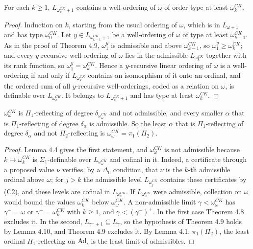 \documentclass[11pt]{article}
\begin{document}
\begin{statement} For each $k \ge 1$, $L_{\omega_k^{CK}+1}$ contains a well-ordering of $\omega$ of
order type at least $\omega_k^{CK}$.
\end{statement}

\begin{proof}
Induction on $k$, starting from the usual ordering of $\omega$, which is in $L_{\omega+1}$ and has type
$\omega_0^{CK}$. Let $y \in L_{\omega_{k-1}^{CK}+1}$ be a well-ordering of $\omega$ of type at least
$\omega_{k-1}^{CK}$. As in the proof of Theorem 4.9, $\omega_1^y$ is admissible and above $\omega_{k-1}^{CK}$, so
$\omega_1^y \ge \omega_k^{CK}$; and every $y$-recursive well-ordering of $\omega$ lies in the admissible
$L_{\omega_k^{CK}}$ together with its rank function, so $\omega_1^y = \omega_k^{CK}$. Hence a $y$-recursive linear
ordering of $\omega$ is a well-ordering if and only if $L_{\omega_k^{CK}}$ contains an isomorphism of it onto an
ordinal, and the ordered sum of all $y$-recursive well-orderings, coded as a relation on $\omega$, is definable over
$L_{\omega_k^{CK}}$. It belongs to $L_{\omega_k^{CK}+1}$ and has type at least $\omega_k^{CK}$.
\end{proof}

\begin{statement} $\omega_\omega^{CK}$ is $\Pi_1$-reflecting of degree
$\delta_{\omega_\omega^{CK}}$ and not admissible, and every smaller $\alpha$ that is $\Pi_1$-reflecting of degree
$\delta_\alpha$ is admissible. So the least $\alpha$ that is $\Pi_1$-reflecting of degree $\delta_\alpha$ and not
$\Pi_2$-reflecting is $\omega_\omega^{CK} = \pi_1(\Pi_2)$.
\end{statement}

\begin{proof}
Lemma 4.4 gives the first statement, and $\omega_\omega^{CK}$ is not admissible because $k \mapsto \omega_k^{CK}$ is
$\Sigma_1$-definable over $L_{\omega_\omega^{CK}}$ and cofinal in it. Indeed, a certificate through a proposed value
$\nu$ verifies, by a $\Delta_0$ condition, that $\nu$ is the $k$-th admissible ordinal above $\omega$; for $j > k$ the
admissible level $L_{\omega_j^{CK}}$ contains these certificates by (C2), and these levels are cofinal in
$L_{\omega_\omega^{CK}}$. If
$L_{\omega_\omega^{CK}}$ were admissible, collection on $\omega$ would bound the values $\omega_k^{CK}$ below
$\omega_\omega^{CK}$. A non-admissible limit $\gamma <
\omega_\omega^{CK}$ has $\gamma^- = \omega$ or $\gamma^- = \omega_k^{CK}$ with $k \ge 1$, and $\gamma < (\gamma^-)^+$.
In the first case Theorem 4.8 excludes it. In the second, $L_{\gamma^- + 1} \subseteq L_\gamma$, so the hypothesis of
Theorem 4.9 holds by Lemma 4.10, and Theorem 4.9 excludes it. By Lemma 4.1, $\pi_1(\Pi_2)$, the least ordinal
$\Pi_1$-reflecting on $\mathrm{Ad}$, is the least limit of admissibles.
\end{proof}
\end{document}
